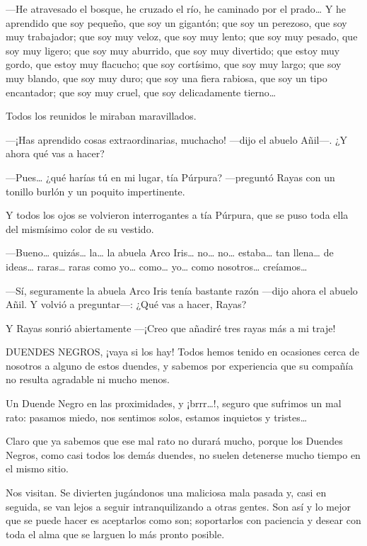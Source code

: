 \documentclass{barcodevapor3pags}
\begin{document}
---He atravesado el bosque, he cruzado el río, he caminado por el
prado\ldots{} Y he aprendido que soy pequeño, que soy un gigantón; que
soy un perezoso, que soy muy trabajador; que soy muy veloz, que soy muy
lento; que soy muy pesado, que soy muy ligero; que soy muy aburrido, que
soy muy divertido; que estoy muy gordo, que estoy muy flacucho; que soy
cortísimo, que soy muy largo; que soy muy blando, que soy muy duro; que
soy una fiera rabiosa, que soy un tipo encantador; que soy muy cruel,
que soy delicadamente tierno\ldots{}

Todos los reunidos le miraban maravillados.

---¡Has aprendido cosas extraordinarias, muchacho! ---dijo el abuelo
Añil---. ¿Y ahora qué vas a hacer?

---Pues\ldots{} ¿qué harías tú en mi lugar, tía Púrpura? ---preguntó
Rayas con un tonillo burlón y un poquito impertinente.

Y todos los ojos se volvieron interrogantes a tía Púrpura, que se puso
toda ella del mismísimo color de su vestido.

---Bueno\ldots{} quizás\ldots{} la\ldots{} la abuela Arco Iris\ldots{}
no\ldots{} no\ldots{} estaba\ldots{} tan llena\ldots{} de ideas\ldots{}
raras\ldots{} raras como yo\ldots{} como\ldots{} yo\ldots{} como
nosotros\ldots{} creíamos\ldots{}

---Sí, seguramente la abuela Arco Iris tenía bastante razón ---dijo
ahora el abuelo Añil. Y volvió a preguntar---: ¿Qué vas a hacer, Rayas?

Y Rayas sonrió abiertamente ---¡Creo que añadiré tres rayas más a mi traje!



 DUENDES NEGROS, ¡vaya si los hay! Todos hemos tenido en ocasiones
cerca de nosotros a alguno de estos duendes, y sabemos por experiencia
que su compañía no resulta agradable ni mucho menos.

Un Duende Negro en las proximidades, y ¡brrr\ldots!, seguro que sufrimos
un mal rato: pasamos miedo, nos sentimos solos, estamos inquietos y
tristes\ldots{}

Claro que ya sabemos que ese mal rato no durará mucho, porque los
Duendes Negros, como casi todos los demás duendes, no suelen detenerse
mucho tiempo en el mismo sitio.

Nos visitan. Se divierten jugándonos una maliciosa mala pasada y, casi
en seguida, se van lejos a seguir intranquilizando a otras gentes. Son
así y lo mejor que se puede hacer es aceptarlos como son; soportarlos
con paciencia y desear con toda el alma que se larguen lo más pronto
posible.
\end{document}
